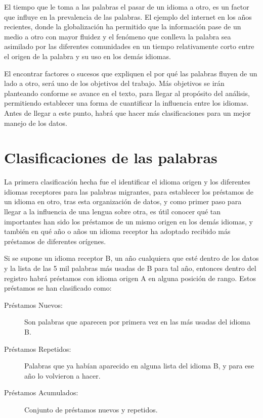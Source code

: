 El tiempo que le toma a las palabras el pasar de un idioma a otro, es un factor que influye en la prevalencia de las palabras. El ejemplo del internet en los años recientes,  donde  la globalización ha permitido que la información pase de un medio a otro con mayor fluidez y el fenómeno que conlleva la palabra sea asimilado por las diferentes comunidades en un tiempo relativamente corto entre el origen de la palabra y su uso en los demás idiomas. 

El encontrar factores o sucesos  que expliquen el por qué las palabras fluyen de un lado a otro, será uno de los objetivos del trabajo. Más objetivos se irán planteando conforme se avance en el texto, para llegar al propósito del análisis, permitiendo establecer una forma de cuantificar la influencia entre los idiomas. Antes de llegar a este punto, habrá que hacer más clasificaciones para un mejor manejo de los datos. 

\newpage

\section{Clasificaciones de las palabras}

La primera clasificación  hecha fue el identificar  el  idioma origen y los diferentes idiomas receptores para las palabras migrantes, para establecer los préstamos de un idioma en otro, tras esta organización de datos, y como primer paso para llegar a la influencia de una lengua sobre otra,  es útil conocer qué tan importantes han sido los préstamos de un mismo origen en los demás idiomas, y también en qué año o años un idioma receptor ha adoptado recibido más préstamos de diferentes orígenes. 

Si se supone un idioma receptor B, un año cualquiera que esté dentro de los datos y  la lista  de las 5 mil palabras más usadas de B para tal año, entonces dentro del registro habrá préstamos con idioma  origen A en alguna posición de rango.  Estos préstamos se han clasificado como:


\begin{description}

	\item [Préstamos Nuevos:] Son palabras que aparecen por primera vez en las más usadas del idioma B.
	
	\item [Préstamos Repetidos:] Palabras que ya habían aparecido en alguna lista del idioma B, y para ese año lo volvieron a hacer.
	
	\item [Préstamos Acumulados:] Conjunto de préstamos nuevos y repetidos.
	
	
\end{description}


